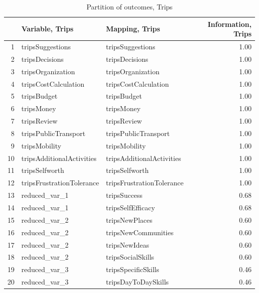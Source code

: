 \documentclass[12pt, a4paper]{article}\usepackage[]{graphicx}\usepackage[]{color}
\makeatletter
\newenvironment{kframe}{%
 \def\at@end@of@kframe{}%
 \ifinner\ifhmode%
  \def\at@end@of@kframe{\end{minipage}}%
  \begin{minipage}{\columnwidth}%
 \fi\fi%
 \def\FrameCommand##1{\hskip\@totalleftmargin \hskip-\fboxsep
 \colorbox{shadecolor}{##1}\hskip-\fboxsep
     \hskip-\linewidth \hskip-\@totalleftmargin \hskip\columnwidth}%
 \MakeFramed {\advance\hsize-\width
   \@totalleftmargin\z@ \linewidth\hsize
   \@setminipage}}%
 {\par\unskip\endMakeFramed%
 \at@end@of@kframe}
\makeatother
\begin{document}
\begin{table}[ht]
\centering
\begin{tabular}{rllr}
  \hline
 & Variable, Trips & Mapping, Trips & Information, Trips \\ 
  \hline
1 & tripsSuggestions & tripsSuggestions & 1.00 \\ 
  2 & tripsDecisions & tripsDecisions & 1.00 \\ 
  3 & tripsOrganization & tripsOrganization & 1.00 \\ 
  4 & tripsCostCalculation & tripsCostCalculation & 1.00 \\ 
  5 & tripsBudget & tripsBudget & 1.00 \\ 
  6 & tripsMoney & tripsMoney & 1.00 \\ 
  7 & tripsReview & tripsReview & 1.00 \\ 
  8 & tripsPublicTransport & tripsPublicTransport & 1.00 \\ 
  9 & tripsMobility & tripsMobility & 1.00 \\ 
  10 & tripsAdditionalActivities & tripsAdditionalActivities & 1.00 \\ 
  11 & tripsSelfworth & tripsSelfworth & 1.00 \\ 
  12 & tripsFrustrationTolerance & tripsFrustrationTolerance & 1.00 \\ 
  13 & reduced\_var\_1 & tripsSuccess & 0.68 \\ 
  14 & reduced\_var\_1 & tripsSelfEfficacy & 0.68 \\ 
  15 & reduced\_var\_2 & tripsNewPlaces & 0.60 \\ 
  16 & reduced\_var\_2 & tripsNewCommunities & 0.60 \\ 
  17 & reduced\_var\_2 & tripsNewIdeas & 0.60 \\ 
  18 & reduced\_var\_2 & tripsSocialSkills & 0.60 \\ 
  19 & reduced\_var\_3 & tripsSpecificSkills & 0.46 \\ 
  20 & reduced\_var\_3 & tripsDayToDaySkills & 0.46 \\ 
   \hline
\end{tabular}
\caption{Partition of outcomes, Trips} 
\end{table}
\begin{kframe}

{\ttfamily\noindent\bfseries\color{errorcolor}{\#\# Error in print.default(m, ..., quote = quote, right = right, max = max): ungültiges 'digits' Argument}}\end{kframe}
\end{document}

